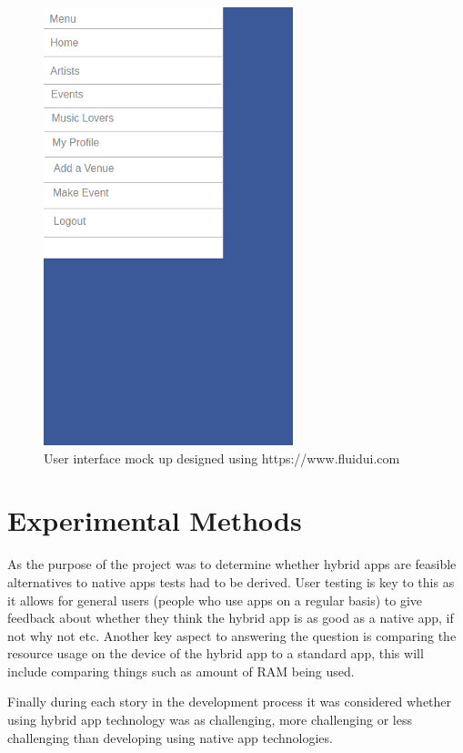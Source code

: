 \begin{figure}[H]
\includegraphics[scale=0.5]{images/ui3}
\caption{User interface mock up designed using https://www.fluidui.com}
\end{figure}

\section{Experimental Methods}
As the purpose of the project was to determine whether hybrid apps are feasible alternatives to native apps tests had to be derived. User testing is key to this as it allows for general users (people who use apps on a regular basis) to give feedback about whether they think the hybrid app is as good as a native app, if not why not etc. Another key aspect to answering the question is comparing the resource usage on the device of the hybrid app to a standard app, this will include comparing things such as amount of RAM being used.

Finally during each story in the development process it was considered whether using hybrid app technology was as challenging, more challenging or less challenging than developing using native app technologies.
